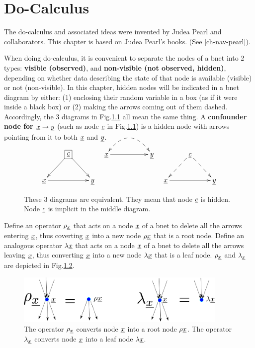 \chapter{Do-Calculus}\label{chap-do-calc}


The do-calculus and associated ideas were
invented by
Judea Pearl and collaborators.
This chapter is 
based on Judea Pearl's
books. (See \ref{ch-nav-pearl}).


When
doing
do-calculus,
it is 
convenient
to separate
the nodes
of a bnet
into
2  types:
{\bf visible (observed)},
and {\bf non-visible (not observed,
hidden)},
depending
on
whether data
describing
the
state 
of that
node
is available 
(visible) or not (non-visible).
In this chapter, hidden nodes will 
be indicated 
in a bnet
diagram by
either: (1)
enclosing
their random variable
in a box (as
if it were inside a black box) or
(2) making
the arrows
coming
out of them
dashed.
Accordingly, 
the 
3 diagrams 
in
Fig.\ref{fig-hidden-dashes}
all mean the same thing.
A {\bf confounder node
for ${\underline{x}}\rightarrow {\underline{y}}$}
(such as node
${\underline{c}}$
in Fig.\ref{fig-hidden-dashes})
is a hidden node 
with arrows
pointing
from it to
both
${\underline{x}}$ and ${\underline{y}}$.



\begin{figure}[h!]
$$\xymatrix{
&*+[F]{\rvc}\ar[dl]\ar[dr]
\\
\rvx\ar[rr]&&\rvy
}
\;\;\;
\xymatrix{
\rvx\ar@{-->}@{<-->}@/^2pc/[rr]
\ar[rr]&&\rvy
}
\;\;\;
\xymatrix{
&\rvc\ar@{-->}[dl]\ar@{-->}[dr]
\\
\rvx\ar[rr]&&\rvy
}$$
\caption{
These 3 diagrams
are equivalent.
They
mean that node ${\underline{c}}$
is hidden.
Node ${\underline{c}}$
is implicit
in the
middle diagram.}
\label{fig-hidden-dashes}
\end{figure}



Define
an
operator
$\rho_{\underline{x}}$
that acts on
a node
${\underline{x}}$
of a bnet
to
delete
all
the 
arrows
entering
${\underline{x}}$,
thus
coverting
${\underline{x}}$
into
a new
node $\rho {\underline{x}}$
that
is a root node.
Define 
an analogous 
operator
$\lambda{\underline{x}}$
that acts on
a node
${\underline{x}}$
of a bnet
to
delete
all
the 
arrows
leaving
${\underline{x}}$,
thus
converting
${\underline{x}}$
into
a new
node $\lambda {\underline{x}}$
that
is a leaf node.
$\rho_{\underline{x}}$
and
$\lambda_{\underline{x}}$
are
depicted
in Fig.\ref{fig-do-rho-lam}.



\begin{figure}[h!]
\centering
\includegraphics[width=4in]
{do/do-rho-lam.png}
\caption{
The operator $\rho_{\underline{x}}$
converts node ${\underline{x}}$
into a root node $\rho {\underline{x}}$.
The operator $\lambda_{\underline{x}}$
converts node ${\underline{x}}$
into a leaf node $\lambda{\underline{x}}$.
} 
\label{fig-do-rho-lam}
\end{figure}


